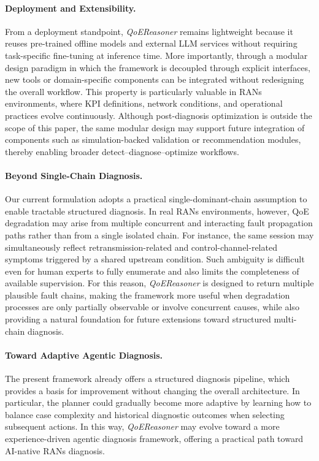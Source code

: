 \documentclass[sigconf,10pt]{acmart} %
\begin{document}
\paragraph{Deployment and Extensibility.}
From a deployment standpoint, \textit{QoEReasoner} remains lightweight because it reuses pre-trained offline models and external LLM services without requiring task-specific fine-tuning at inference time. More importantly, through a modular design paradigm in which the framework is decoupled through explicit interfaces, new tools or domain-specific components can be integrated without redesigning the overall workflow. This property is particularly valuable in RANs environments, where KPI definitions, network conditions, and operational practices evolve continuously. Although post-diagnosis optimization is outside the scope of this paper, the same modular design may support future integration of components such as simulation-backed validation or recommendation modules, thereby enabling broader detect--diagnose--optimize workflows.

\paragraph{Beyond Single-Chain Diagnosis.}
Our current formulation adopts a practical single-dominant-chain assumption to enable tractable structured diagnosis. In real RANs environments, however, QoE degradation may arise from multiple concurrent and interacting fault propagation paths rather than from a single isolated chain. For instance, the same session may simultaneously reflect retransmission-related and control-channel-related symptoms triggered by a shared upstream condition. Such ambiguity is difficult even for human experts to fully enumerate and also limits the completeness of available supervision. For this reason, \textit{QoEReasoner} is designed to return multiple plausible fault chains, making the framework more useful when degradation processes are only partially observable or involve concurrent causes, while also providing a natural foundation for future extensions toward structured multi-chain diagnosis.

\paragraph{Toward Adaptive Agentic Diagnosis.}
The present framework already offers a structured diagnosis pipeline, which provides a basis for improvement without changing the overall architecture. In particular, the planner could gradually become more adaptive by learning how to balance case complexity and historical diagnostic outcomes when selecting subsequent actions. In this way, \textit{QoEReasoner} may evolve toward a more experience-driven agentic diagnosis framework, offering a practical path toward AI-native RANs diagnosis.
\end{document}
